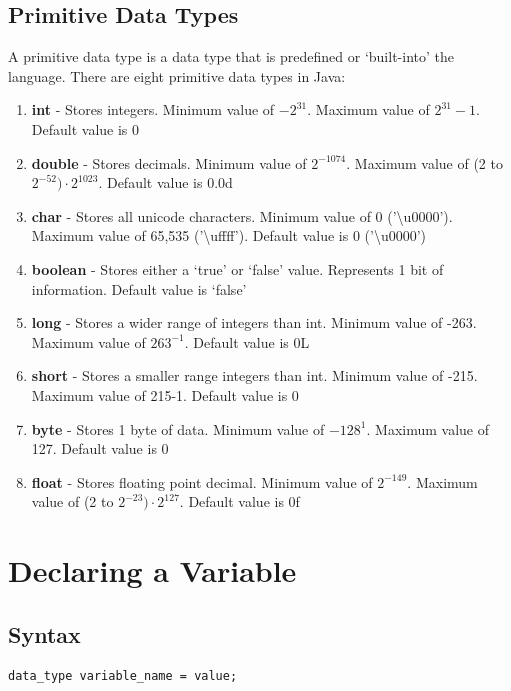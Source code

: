 \documentclass[a4paper]{article}
\begin{document}
\subsection*{Primitive Data Types}
A primitive data type is a data type that is predefined or ‘built-into’ the language. There are eight primitive data types in Java:
\begin{enumerate}

\item \textbf{int} - Stores integers. Minimum value of \(-2^{31}\). Maximum value of \(2^{31}-1\). Default value is 0

\item \textbf{double} - Stores decimals. Minimum value of \(2^{-1074}\). Maximum value of (2 to \(2^{-52})·2^{1023}\). Default value is 0.0d

\item \textbf{char} - Stores all unicode characters. Minimum value of 0 ('\textbackslash u0000'). Maximum value of 65,535 ('\textbackslash uffff'). Default value is 0 ('\textbackslash u0000')

\item \textbf{boolean} - Stores either a ‘true’ or ‘false’ value. Represents 1 bit of information. Default value is ‘false’

\item \textbf{long} - Stores a wider range of integers than int. Minimum value of -263. Maximum value of \(263^{-1}\). Default value is 0L

\item \textbf{short} - Stores a smaller range integers than int. Minimum value of -215. Maximum value of 215-1. Default value is 0

\item \textbf{byte} - Stores 1 byte of data. Minimum value of \(-128^{1}\). Maximum value of 127. Default value is 0

\item \textbf{float} - Stores floating point decimal. Minimum value of \( 2^{-149}\). Maximum value of (2 to \(2^{-23})·2^{127}\). Default value is 0f

\end{enumerate}

\newpage

\section*{Declaring a Variable}

\subsection*{Syntax}
\begin{lstlisting}
data_type variable_name = value;
\end{lstlisting}
\end{document}
